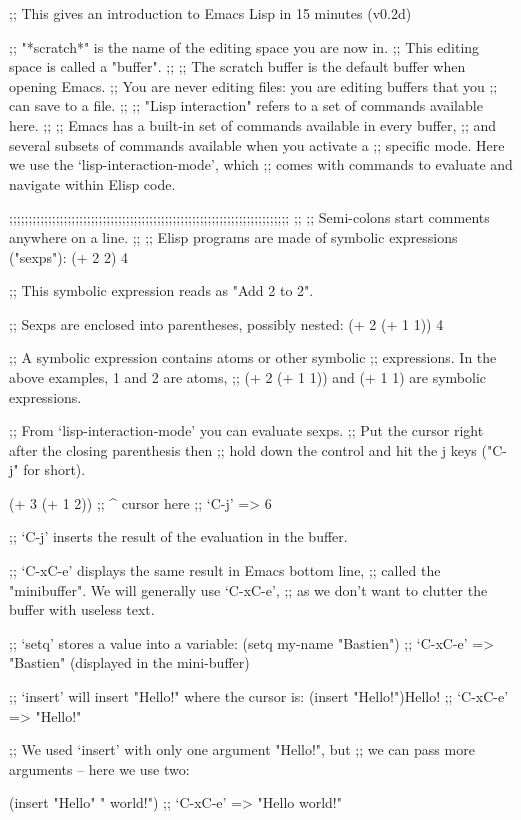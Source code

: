 ;; This gives an introduction to Emacs Lisp in 15 minutes (v0.2d)


;; "*scratch*" is the name of the editing space you are now in.
;; This editing space is called a "buffer".
;;
;; The scratch buffer is the default buffer when opening Emacs.
;; You are never editing files: you are editing buffers that you
;; can save to a file.
;;
;; "Lisp interaction" refers to a set of commands available here.
;;
;; Emacs has a built-in set of commands available in every buffer,
;; and several subsets of commands available when you activate a
;; specific mode.  Here we use the `lisp-interaction-mode', which
;; comes with commands to evaluate and navigate within Elisp code.

;;;;;;;;;;;;;;;;;;;;;;;;;;;;;;;;;;;;;;;;;;;;;;;;;;;;;;;;;;;;;;;;;;;;;;;;
;;
;; Semi-colons start comments anywhere on a line.
;;
;; Elisp programs are made of symbolic expressions ("sexps"):
(+ 2 2)
4

;; This symbolic expression reads as "Add 2 to 2".

;; Sexps are enclosed into parentheses, possibly nested:
(+ 2 (+ 1 1))
4

;; A symbolic expression contains atoms or other symbolic
;; expressions.  In the above examples, 1 and 2 are atoms,
;; (+ 2 (+ 1 1)) and (+ 1 1) are symbolic expressions.

;; From `lisp-interaction-mode' you can evaluate sexps.
;; Put the cursor right after the closing parenthesis then
;; hold down the control and hit the j keys ("C-j" for short).

(+ 3 (+ 1 2))
;;           ^ cursor here
;; `C-j' => 6

;; `C-j' inserts the result of the evaluation in the buffer.

;; `C-xC-e' displays the same result in Emacs bottom line,
;; called the "minibuffer".  We will generally use `C-xC-e',
;; as we don't want to clutter the buffer with useless text.

;; `setq' stores a value into a variable:
(setq my-name "Bastien")
;; `C-xC-e' => "Bastien" (displayed in the mini-buffer)

;; `insert' will insert "Hello!" where the cursor is:
(insert "Hello!")Hello!
;; `C-xC-e' => "Hello!"

;; We used `insert' with only one argument "Hello!", but
;; we can pass more arguments -- here we use two:

(insert "Hello" " world!")
;; `C-xC-e' => "Hello world!"

